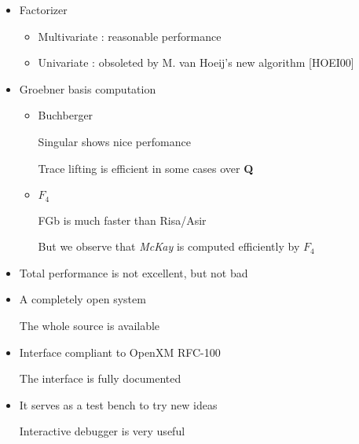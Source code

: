 \documentclass{slides}
\begin{document}
\begin{slide}{}

\begin{itemize}
\item Factorizer

\begin{itemize}
\item Multivariate : reasonable performance

\item Univariate : obsoleted by M. van Hoeij's new algorithm [HOEI00]
\end{itemize}

\item Groebner basis computation

\begin{itemize}
\item Buchberger

Singular shows nice perfomance

Trace lifting is efficient in some cases over {\bf Q}

\item $F_4$

FGb is much faster than Risa/Asir

But we observe that {\it McKay} is computed efficiently by $F_4$
\end{itemize}
\end{itemize}

\end{slide}

\begin{slide}{}

\begin{itemize}
\item Total performance is not excellent, but not bad

\item A completely open system

The whole source is available

\item Interface compliant to OpenXM RFC-100

The interface is fully documented

\item It serves as a test bench to try new ideas

Interactive debugger is very useful
\end{itemize}

\end{slide}
\end{document}
